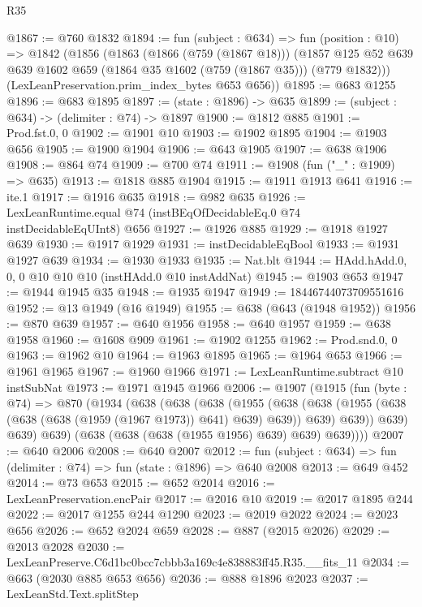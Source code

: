 \begin{lexlean}{R35}
\begin{coremodule}
@1867 := @760 @1832
@1894 := fun (subject : @634) =>
  fun (position : @10) =>
  @1842
    (@1856
      (@1863
        (@1866 (@759 (@1867 @18)))
        (@1857 @125 @52 @639 @639 @1602 @659 (@1864 @35 @1602 (@759 (@1867 @35))) (@779 @1832)))
      (LexLeanPreservation.prim_index_bytes @653 @656))
@1895 := @683 @1255
@1896 := @683 @1895
@1897 := (state : @1896) -> @635
@1899 := (subject : @634) -> (delimiter : @74) -> @1897
@1900 := @1812 @885
@1901 := Prod.fst.{0, 0}
@1902 := @1901 @10
@1903 := @1902 @1895
@1904 := @1903 @656
@1905 := @1900 @1904
@1906 := @643 @1905
@1907 := @638 @1906
@1908 := @864 @74
@1909 := @700 @74
@1911 := @1908 (fun ("_" : @1909) => @635)
@1913 := @1818 @885 @1904
@1915 := @1911 @1913 @641
@1916 := ite.{1}
@1917 := @1916 @635
@1918 := @982 @635
@1926 := LexLeanRuntime.equal @74 (instBEqOfDecidableEq.{0} @74 instDecidableEqUInt8) @656
@1927 := @1926 @885
@1929 := @1918 @1927 @639
@1930 := @1917 @1929
@1931 := instDecidableEqBool
@1933 := @1931 @1927 @639
@1934 := @1930 @1933
@1935 := Nat.blt
@1944 := HAdd.hAdd.{0, 0, 0} @10 @10 @10 (instHAdd.{0} @10 instAddNat)
@1945 := @1903 @653
@1947 := @1944 @1945 @35
@1948 := @1935 @1947
@1949 := 18446744073709551616
@1952 := @13 @1949 (@16 @1949)
@1955 := @638 (@643 (@1948 @1952))
@1956 := @870 @639
@1957 := @640 @1956
@1958 := @640 @1957
@1959 := @638 @1958
@1960 := @1608 @909
@1961 := @1902 @1255
@1962 := Prod.snd.{0, 0}
@1963 := @1962 @10
@1964 := @1963 @1895
@1965 := @1964 @653
@1966 := @1961 @1965
@1967 := @1960 @1966
@1971 := LexLeanRuntime.subtract @10 instSubNat
@1973 := @1971 @1945 @1966
@2006 := @1907
    (@1915
      (fun (byte : @74) =>
      @870
        (@1934
          (@638
            (@638
              (@638
                (@1955
                  (@638
                    (@638 (@1955 (@638 (@638 (@638 (@1959 (@1967 @1973)) @641) @639) @639)) @639)
                    @639))
                @639)
              @639)
            @639)
          (@638 (@638 (@638 (@1955 @1956) @639) @639) @639))))
@2007 := @640 @2006
@2008 := @640 @2007
@2012 := fun (subject : @634) => fun (delimiter : @74) => fun (state : @1896) => @640 @2008
@2013 := @649 @452
@2014 := @73 @653
@2015 := @652 @2014
@2016 := LexLeanPreservation.encPair
@2017 := @2016 @10
@2019 := @2017 @1895 @244
@2022 := @2017 @1255 @244 @1290
@2023 := @2019 @2022
@2024 := @2023 @656
@2026 := @652 @2024 @659
@2028 := @887 (@2015 @2026)
@2029 := @2013 @2028
@2030 := LexLeanPreserve.C6d1bc0bcc7cbbb3a169c4e838883ff45.R35.__fits_11
@2034 := @663 (@2030 @885 @653 @656)
@2036 := @888 @1896 @2023
@2037 := LexLeanStd.Text.splitStep

\end{coremodule}
\end{lexlean}
